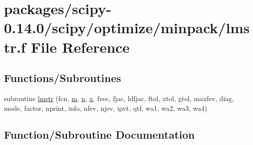 \hypertarget{lmstr_8f}{}\section{packages/scipy-\/0.14.0/scipy/optimize/minpack/lmstr.f File Reference}
\label{lmstr_8f}
\subsection*{Functions/\+Subroutines}
\begin{DoxyCompactItemize}
\item 
subroutine \hyperlink{lmstr_8f_a33ea8dcd28f01bcb10aa0ea06e997f55}{lmstr} (fcn, \hyperlink{indexexpr_8h_ab72fdb4031d47b75ab26dd18a437bcdc}{m}, \hyperlink{indexexpr_8h_ab427e2e2b4d6cec55fa088ea2a692ace}{n}, \hyperlink{vecnorm1_8cc_ac73eed9e41ec09d58f112f06c2d6cb63}{x}, fvec, fjac, ldfjac, ftol, xtol, gtol, maxfev, diag, mode, factor, nprint, info, nfev, njev, ipvt, qtf, wa1, wa2, wa3, wa4)
\end{DoxyCompactItemize}


\subsection{Function/\+Subroutine Documentation}
\hypertarget{lmstr_8f_a33ea8dcd28f01bcb10aa0ea06e997f55}{}
